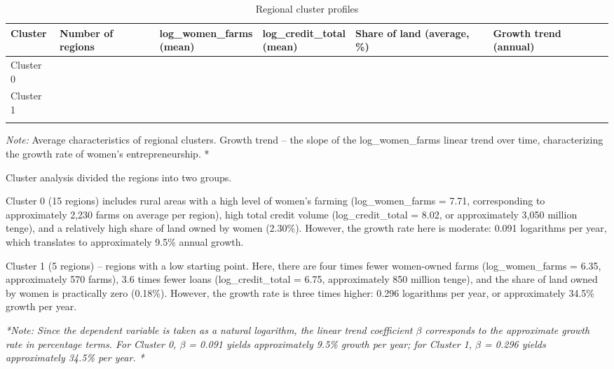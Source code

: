 ﻿\documentclass[pdflatex,sn-mathphys-ay]{sn-jnl}
\begin{document}
\begin{table}[htbp]
\caption{Regional cluster profiles}\label{tab:cluster-profiles}
\scriptsize
\renewcommand{\arraystretch}{1.1}
\setlength{\tabcolsep}{3pt}
\begin{tabularx}{\textwidth}{>{\raggedright\arraybackslash}p{}>{\centering\arraybackslash}p{}>{\raggedright\arraybackslash}X>{\raggedright\arraybackslash}X>{\raggedright\arraybackslash}X>{\centering\arraybackslash}p{}}
\toprule
Cluster & Number of regions & \shortstack[l]{log\_women\_farms\\(mean)} & \shortstack[l]{log\_credit\_total\\(mean)} & Share of land (average, \%) & Growth trend (annual)\\
\midrule
Cluster 0 & 15 & 7.71 & 8.02 & 2.30 & 0.091\\
Cluster 1 & 5 & 6.35 & 6.75 & 0.18 & 0.296\\
\botrule
\end{tabularx}
\setlength{\tabcolsep}{6pt}
\renewcommand{\arraystretch}{1}
\end{table}

\emph{Note:} Average characteristics of regional clusters. Growth trend -- the
slope of the log\_women\_farms linear trend over time, characterizing
the growth rate of women's entrepreneurship. *

Cluster analysis divided the regions into two groups.

Cluster 0 (15 regions) includes rural areas with a high level of women's
farming (log\_women\_farms = 7.71, corresponding to approximately 2,230
farms on average per region), high total credit volume
(log\_credit\_total = 8.02, or approximately 3,050 million tenge), and a
relatively high share of land owned by women (2.30\%). However, the
growth rate here is moderate: 0.091 logarithms per year, which
translates to approximately 9.5\% annual growth.

Cluster 1 (5 regions) -- regions with a low starting point. Here, there
are four times fewer women-owned farms (log\_women\_farms = 6.35, approximately
570 farms), 3.6 times fewer loans (log\_credit\_total = 6.75, approximately 850
million tenge), and the share of land owned by women is practically zero
(0.18\%). However, the growth rate is three times higher: 0.296
logarithms per year, or approximately 34.5\% growth per year.

\emph{*Note: Since the dependent variable is taken as a natural
logarithm,
the linear trend coefficient $\beta$ corresponds to the approximate growth
rate in percentage terms. For Cluster 0, $\beta$ = 0.091 yields approximately 9.5\%
growth per year; for Cluster 1, $\beta$ = 0.296 yields approximately 34.5\% per
year. *}
\end{document}
